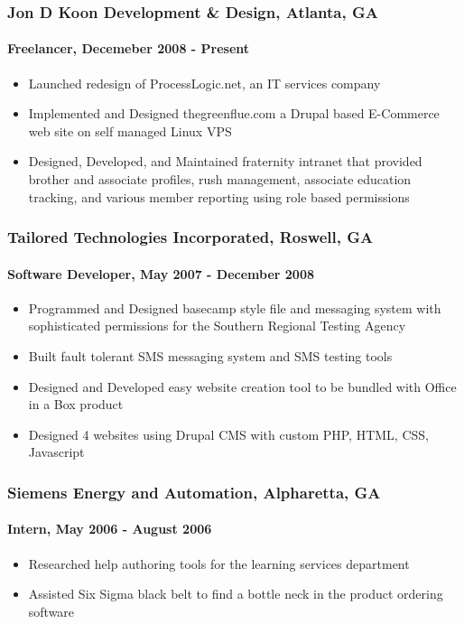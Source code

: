 \subsubsection{Jon D Koon Development \& Design, Atlanta, GA}

\paragraph{Freelancer, Decemeber 2008 - Present}

\begin{itemize}
\item
  Launched redesign of ProcessLogic.net, an IT services company
\item
  Implemented and Designed thegreenflue.com a Drupal based E-Commerce
  web site on self managed Linux VPS
\item
  Designed, Developed, and Maintained fraternity intranet that provided
  brother and associate profiles, rush management, associate education
  tracking, and various member reporting using role based permissions
\end{itemize}
\subsubsection{Tailored Technologies Incorporated, Roswell, GA}

\paragraph{Software Developer, May 2007 - December 2008}

\begin{itemize}
\item
  Programmed and Designed basecamp style file and messaging system with
  sophisticated permissions for the Southern Regional Testing Agency
\item
  Built fault tolerant SMS messaging system and SMS testing tools
\item
  Designed and Developed easy website creation tool to be bundled with
  Office in a Box product
\item
  Designed 4 websites using Drupal CMS with custom PHP, HTML, CSS,
  Javascript
\end{itemize}
\subsubsection{Siemens Energy and Automation, Alpharetta, GA}

\paragraph{Intern, May 2006 - August 2006}

\begin{itemize}
\item
  Researched help authoring tools for the learning services department
\item
  Assisted Six Sigma black belt to find a bottle neck in the product
  ordering software
\end{itemize}
